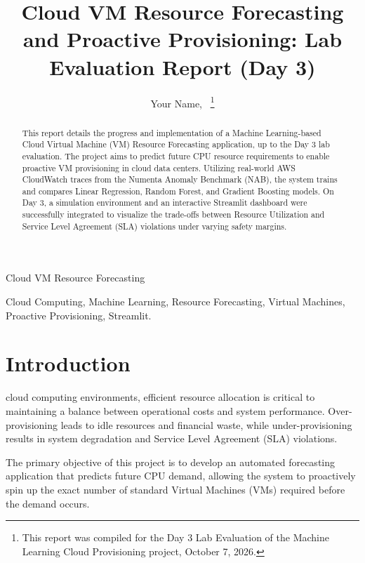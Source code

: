 \documentclass[journal,onecolumn]{IEEEtran}
\begin{document}
\title{Cloud VM Resource Forecasting and Proactive Provisioning: Lab Evaluation Report (Day 3)}

\author{Your Name,~
\thanks{This report was compiled for the Day 3 Lab Evaluation of the Machine Learning Cloud Provisioning project, October 7, 2026.}}

%
{Cloud VM Resource Forecasting}

\maketitle

\begin{abstract}
This report details the progress and implementation of a Machine Learning-based Cloud Virtual Machine (VM) Resource Forecasting application, up to the Day 3 lab evaluation. The project aims to predict future CPU resource requirements to enable proactive VM provisioning in cloud data centers. Utilizing real-world AWS CloudWatch traces from the Numenta Anomaly Benchmark (NAB), the system trains and compares Linear Regression, Random Forest, and Gradient Boosting models. On Day 3, a simulation environment and an interactive Streamlit dashboard were successfully integrated to visualize the trade-offs between Resource Utilization and Service Level Agreement (SLA) violations under varying safety margins.
\end{abstract}

\begin{IEEEkeywords}
Cloud Computing, Machine Learning, Resource Forecasting, Virtual Machines, Proactive Provisioning, Streamlit.
\end{IEEEkeywords}

\IEEEpeerreviewmaketitle

\section{Introduction}
 cloud computing environments, efficient resource allocation is critical to maintaining a balance between operational costs and system performance. Over-provisioning leads to idle resources and financial waste, while under-provisioning results in system degradation and Service Level Agreement (SLA) violations.

The primary objective of this project is to develop an automated forecasting application that predicts future CPU demand, allowing the system to proactively spin up the exact number of standard Virtual Machines (VMs) required before the demand occurs. 
\end{document}
